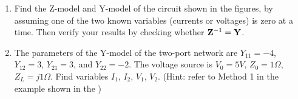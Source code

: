 \begin{enumerate}
\item Find the Z-model and Y-model of the circuit shown in the figures, by
assuming one of the two known variables (currents or voltages) is zero at
a time. Then verify your results by checking whether ${\bf Z}^{-1}={\bf Y}$.


% 

\item The parameters of the Y-model of the two-port network are $Y_{11}=-4$, 
$Y_{12}=3$, $Y_{21}=3$, and $Y_{22}=-2$. The voltage source is $V_0=5V$, 
$Z_0=1\Omega$, $Z_L=j1\Omega$. Find variables $I_1$, $I_2$, $V_1$, $V_2$. 
(Hint: refer to Method 1 in the example shown in the
)



\end{enumerate}
